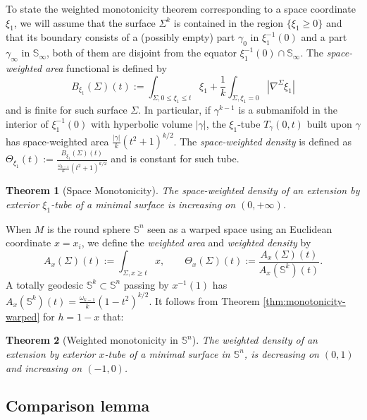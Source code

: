 \documentclass[11pt]{article}
\newtheorem{theorem}{Theorem}
\begin{document}
To state the weighted monotonicity theorem corresponding to a space coordinate \(\xi_1\),
we will assume that the surface \(\Sigma^k\) is contained in the region \(\{\xi_1 \geq 0\}\) and that its boundary consists of a (possibly empty) part
\(\gamma_0\) in \(\xi_1^{-1}(0)\) and a part \(\gamma_\infty\) in \(\mathbb{S}_\infty\), both of them
are disjoint from the equator \(\xi_1^{-1}(0) \cap \mathbb{S}_{\infty}\).
The \emph{space-weighted area} functional is defined by
\[
B_{\xi_1}(\Sigma)(t):=\int_{\Sigma, 0\leq\xi_1\leq t}\xi_1 + \frac{1}{k}\int_{\Sigma,\xi_1=0}|\nabla^\Sigma\xi_1|
\]
and is finite for such surface \(\Sigma\). In particular, if  \(\gamma^{k-1}\) is a submanifold in the interior of \(\xi_1^{-1}(0)\) with hyperbolic volume \(|\gamma|\), the \(\xi_1\)-tube  \(T_\gamma(0,t)\) built upon \(\gamma\) has space-weighted area \(\frac{|\gamma|}{k}(t^2+1)^{k/2}\).
The \emph{space-weighted density} is defined as \(\Theta_{\xi_1}(t):=\frac{B_{\xi_1}(\Sigma)(t)}{\frac{\omega_{k-1}}{k}(t^2+1)^{k/2}}\) and is
constant for such tube.
\begin{theorem}[Space Monotonicity]
\label{thm:monotonicity-H-space}
The space-weighted density of an extension by exterior \(\xi_1\)-tube of a minimal
surface is increasing on \((0,+\infty)\).
\end{theorem}

When \(M\) is the round sphere \(\mathbb{S}^n\) seen as a warped space using an Euclidean coordinate \(x=x_i\), we
define the \emph{weighted area} and \emph{weighted density} by
\[
 A_x(\Sigma)(t):= \int_{\Sigma,x\geq t}x,\qquad \Theta_x(\Sigma)(t) :=
\frac{A_x(\Sigma)(t)}{A_x(\mathbb{S}^k)(t)}.
\]
A totally geodesic \(\mathbb{S}^k\subset \mathbb{S}^n\) passing by \(x^{-1}(1)\) has  \(A_x(\mathbb{S}^k)(t) = \frac{\omega_{k-1}}{k}(1-t^2)^{k/2}\). 
It follows from Theorem \ref{thm:monotonicity-warped} for \(h=1-x\) that:

\begin{theorem}[Weighted monotonicity in \( \mathbb{S}^n \)]
\label{thm:monotonicity-S}
The weighted density of an extension by exterior
\(x\)-tube of a minimal surface in \(\mathbb{S}^n\), is decreasing on \((0, 1)\) and increasing on \((-1,0)\).
\end{theorem}
\subsection{Comparison lemma}
\label{sec:orga4bfb70}
\end{document}
